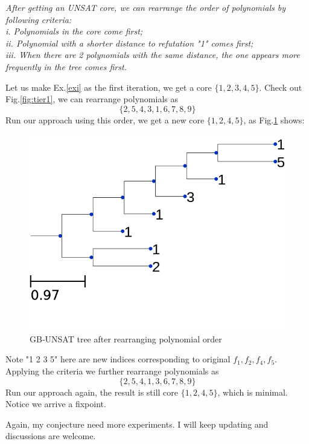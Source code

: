 \emph{After getting an UNSAT core, we can rearrange the order of polynomials by following criteria:\\
i. Polynomials in the core come first;\\
ii. Polynomial with a shorter distance to refutation "1" comes first;\\
iii. When there are 2 polynomials with the same distance, the one appears more frequently in the tree comes first.}

\begin{Example}
Let us make Ex.\ref{exi} as the first iteration, we get a core $\{1,2,3,4,5\}$. Check out Fig.\ref{fig:tier1},
we can rearrange polynomials as
$$\{2,5,4,3,1,6,7,8,9\}$$
Run our approach using this order, we get a new core $\{1,2,4,5\}$, as Fig.\ref{fig:tier2} shows:
\begin{figure}[hbt]
\centering
\includegraphics[scale=0.6]{tier2.png}
\caption{GB-UNSAT tree after rearranging polynomial order}
\label{fig:tier2}
\end{figure}
Note "1 2 3 5" here are new indices corresponding to original $f_1,f_2,f_4,f_5$. Applying the criteria
we further rearrange polynomials as
$$\{2,5,4,1,3,6,7,8,9\}$$
Run our approach again, the result is still core $\{1,2,4,5\}$, which is minimal. Notice we arrive a fixpoint.
\end{Example}

Again, my conjecture need more experiments. I will keep updating and discussions are welcome.